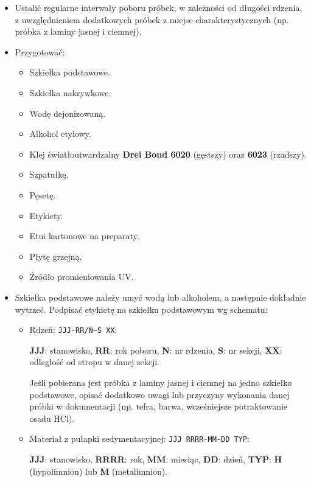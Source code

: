 \documentclass[
  letterpaper,
  DIV=11,
  numbers=noendperiod]{scrreprt}
\begin{document}
\begin{itemize}
\item
  Ustalić regularne interwały poboru próbek, w zależności od długości
  rdzenia, z uwzględnieniem dodatkowych próbek z miejsc
  charakterystycznych (np. próbka z laminy jasnej i ciemnej).
\item
  Przygotować:

  \begin{itemize}
  \item
    Szkiełka podstawowe.
  \item
    Szkiełka nakrywkowe.
  \item
    Wodę dejonizowaną.
  \item
    Alkohol etylowy.
  \item
    Klej światłoutwardzalny \textbf{Drei Bond 6020} (gęstszy) oraz
    \textbf{6023} (rzadszy).
  \item
    Szpatułkę.
  \item
    Pęsetę.
  \item
    Etykiety.
  \item
    Etui kartonowe na preparaty.
  \item
    Płytę grzejną.
  \item
    Źródło promieniowania UV.
  \end{itemize}
\item
  Szkiełka podstawowe należy umyć wodą lub alkoholem, a następnie
  dokładnie wytrzeć. Podpisać etykietę na szkiełku podstawowym wg
  schematu:

  \begin{itemize}
  \item
    Rdzeń: \texttt{JJJ-RR/N–S\ XX}:

    \textbf{JJJ}: stanowisko, \textbf{RR}: rok poboru, \textbf{N}: nr
    rdzenia, \textbf{S}: nr sekcji, \textbf{XX}: odległość od stropu w
    danej sekcji.

    Jeśli pobierana jest próbka z laminy jasnej i ciemnej na jedno
    szkiełko podstawowe, opisać dodatkowo uwagi lub przyczyny wykonania
    danej próbki w dokumentacji (np. tefra, barwa, wcześniejsze
    potraktowanie osadu HCl).
  \item
    Materiał z pułapki sedymentacyjnej: \texttt{JJJ\ RRRR-MM-DD\ TYP}:

    \textbf{JJJ}: stanowisko, \textbf{RRRR}: rok, \textbf{MM}: miesiąc,
    \textbf{DD}: dzień, \textbf{TYP}: \textbf{H} (hypolimnion) lub
    \textbf{M} (metalimnion).
  \end{itemize}
\end{itemize}
\end{document}
